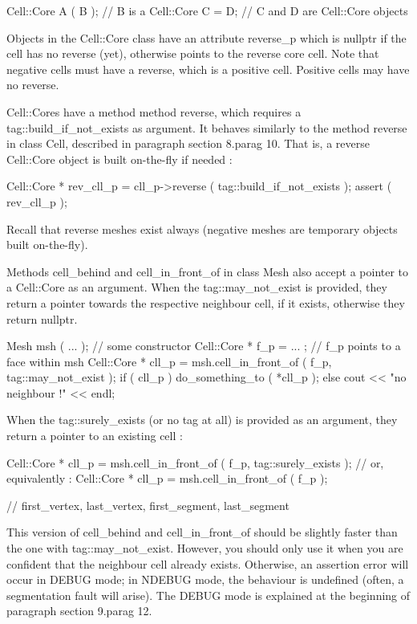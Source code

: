 {\verbatim
   Cell::Core A ( B );  //  B is a Cell::Core
   C = D;  //  C and D are Cell::Core objects
\endverbatim

Objects in the {\codett Cell::Core} class have an attribute {\codett reverse\_p}
which is {\codett nullptr} if the cell has no reverse (yet), otherwise points to the
reverse core cell.
Note that negative cells must have a reverse, which is a positive cell.
Positive cells may have no reverse.

{\codett Cell::Core}s have a method method {\codett reverse}, which requires a
{\codett tag::build\_if\_not\_exists} as argument.
It behaves similarly to the method {\codett reverse} in class {\codett Cell},
described in paragraph \numb section 8.\numb parag 10.
That is, a reverse {\codett Cell::Core} object is built on-the-fly if needed :

\verbatim
   Cell::Core * rev_cll_p = cll_p->reverse ( tag::build_if_not_exists );
   assert ( rev_cll_p );
\endverbatim

Recall that reverse meshes exist always (negative meshes are temporary objects built
on-the-fly).

Methods {\codett cell\_behind} and {\codett cell\_in\_front\_of} in class {\codett Mesh}
also accept a pointer to a {\codett Cell::Core} as an argument.
When the {\codett tag::may\_not\_exist} is provided,
they return a pointer towards the respective neighbour cell, if it exists, otherwise
they return {\codett nullptr}.

\verbatim
   Mesh msh ( ... );  // some constructor
   Cell::Core * f_p = ... ;  //  f_p points to a face within msh
   Cell::Core * cll_p = msh.cell_in_front_of ( f_p, tag::may_not_exist );
   if ( cll_p ) do_something_to ( *cll_p );
   else cout << "no neighbour !" << endl;
\endverbatim

When the {\codett tag::surely\_exists} (or no tag at all) is provided as an argument,
they return a pointer to an existing cell :

\verbatim
   Cell::Core * cll_p = msh.cell_in_front_of ( f_p, tag::surely_exists );
   // or, equivalently :
   Cell::Core * cll_p = msh.cell_in_front_of ( f_p );

   // first_vertex, last_vertex, first_segment, last_segment
\endverbatim

This version of {\codett cell\_behind} and {\codett cell\_in\_front\_of} should be
slightly faster than the one with {\codett tag::may\_not\_exist}.
However, you should only use it when you are confident that the neighbour cell already
exists.
Otherwise, an {\codett assertion error} will occur in {\codett DEBUG} mode;
in {\codett NDEBUG} mode, the behaviour is undefined (often, a {\codett segmentation fault}
will arise).
The {\codett DEBUG} mode is explained at the beginning of paragraph \numb section
9.\numb parag 12.

}
